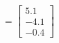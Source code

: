 \documentclass[preview]{standalone}
\begin{document}
\begin{align*}
=\begin{bmatrix} 5.1 \\ -4.1 \\ -0.4 \end{bmatrix}
\end{align*}
\end{document}
